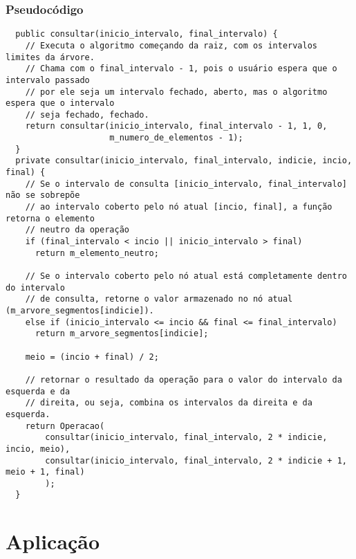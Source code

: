 \documentclass{article}
\begin{document}
\subsubsection{Pseudocódigo}
\begin{verbatim}
  public consultar(inicio_intervalo, final_intervalo) {
    // Executa o algoritmo começando da raiz, com os intervalos limites da árvore.
    // Chama com o final_intervalo - 1, pois o usuário espera que o intervalo passado 
    // por ele seja um intervalo fechado, aberto, mas o algoritmo espera que o intervalo
    // seja fechado, fechado.
    return consultar(inicio_intervalo, final_intervalo - 1, 1, 0,
                     m_numero_de_elementos - 1);
  }
  private consultar(inicio_intervalo, final_intervalo, indicie, incio, final) {
    // Se o intervalo de consulta [inicio_intervalo, final_intervalo] não se sobrepõe
    // ao intervalo coberto pelo nó atual [incio, final], a função retorna o elemento 
    // neutro da operação
    if (final_intervalo < incio || inicio_intervalo > final) 
      return m_elemento_neutro;

    // Se o intervalo coberto pelo nó atual está completamente dentro do intervalo
    // de consulta, retorne o valor armazenado no nó atual (m_arvore_segmentos[indicie]).
    else if (inicio_intervalo <= incio && final <= final_intervalo) 
      return m_arvore_segmentos[indicie];

    meio = (incio + final) / 2; 

    // retornar o resultado da operação para o valor do intervalo da esquerda e da 
    // direita, ou seja, combina os intervalos da direita e da esquerda.
    return Operacao(
        consultar(inicio_intervalo, final_intervalo, 2 * indicie, incio, meio),
        consultar(inicio_intervalo, final_intervalo, 2 * indicie + 1, meio + 1, final)
        );
  }
\end{verbatim}

\section{Aplicação}
\end{document}
